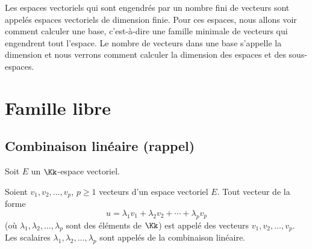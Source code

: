 \documentclass[class=report,crop=false]{standalone}
\begin{document}







\bigskip



Les espaces vectoriels qui sont engendrés par un nombre fini de vecteurs sont appelés
espaces vectoriels de dimension finie. Pour ces espaces, nous allons voir comment calculer
une base, c'est-à-dire une famille minimale de vecteurs qui engendrent tout l'espace.
Le nombre de vecteurs dans une base s'appelle la dimension et nous verrons comment calculer
la dimension des espaces et des sous-espaces.



\section{Famille libre}

\subsection{Combinaison linéaire (rappel)}

Soit $E$ un $\Kk$-espace vectoriel.

\begin{definition}
 Soient  $v_1, v_2, \ldots, v_p$, $p \ge 1$  vecteurs d'un espace vectoriel $E$.
 Tout vecteur de la forme
 $$u=\lambda_1 v_1+\lambda_2v_2+ \cdots + \lambda_pv_p$$
 (où $\lambda_1, \lambda_2, \ldots,  \lambda_p$ sont des éléments de $\Kk$)
 est appelé  des vecteurs $v_1, v_2, \ldots, v_p$.
 Les scalaires $\lambda_1, \lambda_2, \ldots , \lambda_p$
 sont appelés  de la combinaison linéaire.
\end{definition}
\end{document}

